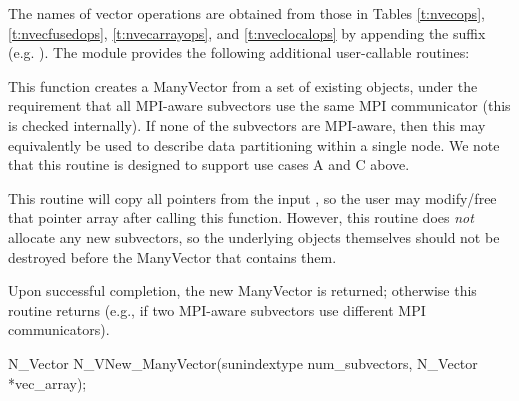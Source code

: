 The names of vector operations are obtained from those in Tables
\ref{t:nvecops}, \ref{t:nvecfusedops}, \ref{t:nvecarrayops}, and
\ref{t:nveclocalops} by appending the suffix  
(e.g. ).
The module {\nvecmanyvector} provides the following additional
user-callable routines:
{
  This function creates a ManyVector from a set of existing {\nvector}
  objects, under the requirement that all MPI-aware subvectors use the
  same MPI communicator (this is checked internally).  If none of the
  subvectors are MPI-aware, then this may equivalently be used to
  describe data partitioning within a single node.  We note that this
  routine is designed to support use cases A and C above.

  This routine will copy all  pointers from the input
  , so the user may modify/free that pointer array
  after calling this function.  However, this routine does \emph{not}
  allocate any new subvectors, so the underlying {\nvector} objects
  themselves should not be destroyed before the ManyVector that
  contains them.

  Upon successful completion, the new ManyVector is returned;
  otherwise this routine returns  (e.g., if two MPI-aware
  subvectors use different MPI communicators).
}
{
  N\_Vector N\_VNew\_ManyVector(sunindextype num\_subvectors,
  N\_Vector *vec\_array);
}
